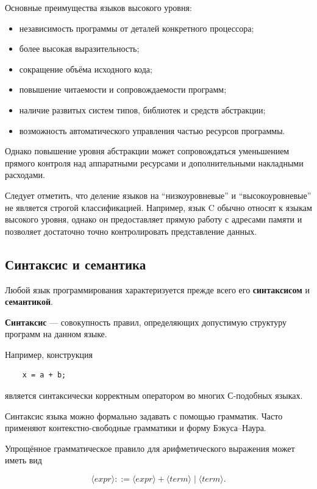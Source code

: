 Основные преимущества языков высокого уровня:

\begin{itemize}
	\item независимость программы от деталей конкретного процессора;
	\item более высокая выразительность;
	\item сокращение объёма исходного кода;
	\item повышение читаемости и сопровождаемости программ;
	\item наличие развитых систем типов, библиотек и средств абстракции;
	\item возможность автоматического управления частью ресурсов программы.
\end{itemize}

Однако повышение уровня абстракции может сопровождаться уменьшением прямого
контроля над аппаратными ресурсами и дополнительными накладными расходами.

Следует отметить, что деление языков на ``низкоуровневые'' и
``высокоуровневые'' не является строгой классификацией. Например, язык C
обычно относят к языкам высокого уровня, однако он предоставляет прямую работу
с адресами памяти и позволяет достаточно точно контролировать представление
данных.

\subsection{Синтаксис и семантика}

Любой язык программирования характеризуется прежде всего его
\textbf{синтаксисом} и \textbf{семантикой}.

\textbf{Синтаксис} --- совокупность правил, определяющих допустимую структуру
программ на данном языке.

Например, конструкция

\begin{verbatim}
	x = a + b;
\end{verbatim}

является синтаксически корректным оператором во многих С-подобных языках.

Синтаксис языка можно формально задавать с помощью грамматик. Часто применяют
контекстно-свободные грамматики и форму Бэкуса--Наура.

Упрощённое грамматическое правило для арифметического выражения может иметь вид

\[
\langle expr \rangle ::=
\langle expr \rangle + \langle term \rangle
\;|\;
\langle term \rangle.
\]

